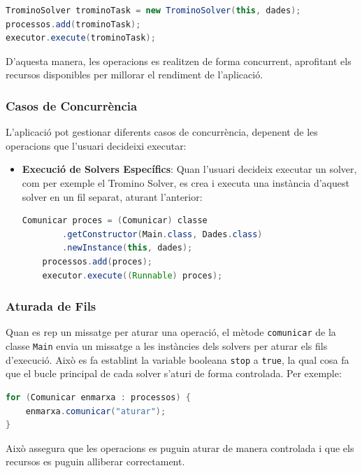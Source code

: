 \documentclass{ieeetj}
\begin{document}
\begin{lstlisting}[language=Java, basicstyle=\ttfamily\small]
TrominoSolver trominoTask = new TrominoSolver(this, dades);
processos.add(trominoTask);
executor.execute(trominoTask);
\end{lstlisting}

D'aquesta manera, les operacions es realitzen de forma concurrent, aprofitant els recursos disponibles per millorar el rendiment de l'aplicació.

\subsubsection{Casos de Concurrència}
L'aplicació pot gestionar diferents casos de concurrència, depenent de les operacions que l'usuari decideixi executar:

\begin{itemize}
   
    \item \textbf{Execució de Solvers Específics}: Quan l'usuari decideix executar un solver, com per exemple el Tromino Solver, es crea i executa una instància d'aquest solver en un fil separat, aturant l'anterior:


    \begin{lstlisting}[language=Java, basicstyle=\ttfamily\small]
    Comunicar proces = (Comunicar) classe
        .getConstructor(Main.class, Dades.class)
        .newInstance(this, dades);
    processos.add(proces);
    executor.execute((Runnable) proces);
    \end{lstlisting}
\end{itemize}

\subsubsection{Aturada de Fils}
Quan es rep un missatge per aturar una operació, el mètode \texttt{comunicar} de la classe \texttt{Main} envia un missatge a les instàncies dels solvers per aturar els fils d'execució. Això es fa establint la variable booleana \texttt{stop} a \texttt{true}, la qual cosa fa que el bucle principal de cada solver s'aturi de forma controlada. Per exemple:

\begin{lstlisting}[language=Java, basicstyle=\ttfamily\small]
for (Comunicar enmarxa : processos) {
    enmarxa.comunicar("aturar");
}
\end{lstlisting}

Això assegura que les operacions es puguin aturar de manera controlada i que els recursos es puguin alliberar correctament.
\end{document}
